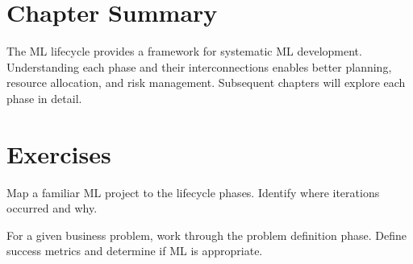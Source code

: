\section{Chapter Summary}

The ML lifecycle provides a framework for systematic ML development. Understanding each phase and their interconnections enables better planning, resource allocation, and risk management. Subsequent chapters will explore each phase in detail.

\section{Exercises}

\begin{exercise}
Map a familiar ML project to the lifecycle phases. Identify where iterations occurred and why.
\end{exercise}

\begin{exercise}
For a given business problem, work through the problem definition phase. Define success metrics and determine if ML is appropriate.
\end{exercise}
